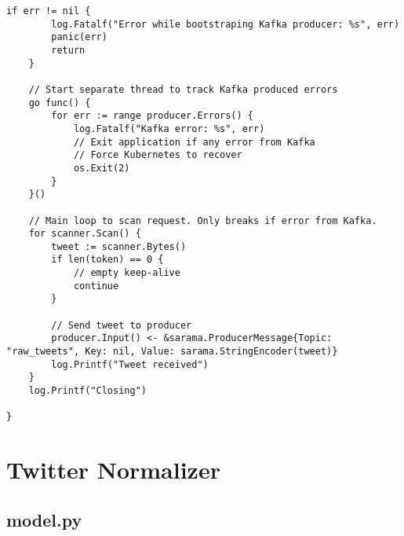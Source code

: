 \begin{lstlisting}[language=Golang]
	if err != nil {
		log.Fatalf("Error while bootstraping Kafka producer: %s", err)
		panic(err)
		return
	}

	// Start separate thread to track Kafka produced errors
	go func() {
		for err := range producer.Errors() {
			log.Fatalf("Kafka error: %s", err)
			// Exit application if any error from Kafka
			// Force Kubernetes to recover
			os.Exit(2)
		}
	}()

	// Main loop to scan request. Only breaks if error from Kafka.
	for scanner.Scan() {
		tweet := scanner.Bytes()
		if len(token) == 0 {
			// empty keep-alive
			continue
		}

		// Send tweet to producer
		producer.Input() <- &sarama.ProducerMessage{Topic: "raw_tweets", Key: nil, Value: sarama.StringEncoder(tweet)}
		log.Printf("Tweet received")
	}
	log.Printf("Closing")

}
\end{lstlisting}
\newpage
\section{Twitter Normalizer}

\subsection{model.py}

